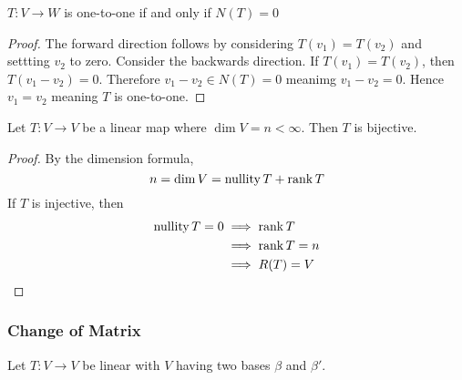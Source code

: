 \documentclass[../notes.tex]{subfiles}
\begin{document}
\begin{theorem}
    $T : V \to W$ is one-to-one if and only if $N(T) = \qty{0}$
\end{theorem}

\begin{proof}
    The forward direction follows by considering $T(v_1) = T(v_2)$ and settting $v_2$ to zero. Consider the backwards direction. If $T(v_1) = T(v_2)$, then $T(v_1 - v_2) = 0$. Therefore $v_1 - v_2 \in N(T) = \qty{0}$ meanimg $v_1 - v_2 = 0$. Hence $v_1 = v_2$ meaning $T$ is one-to-one.
\end{proof}

\begin{theorem}
    Let $T: V \to V$ be a linear map where $\dim V = n < \infty$. Then $T$ is bijective.
\end{theorem}
\begin{proof}
    By the dimension formula,
    \[
        n = \dim V = \operatorname{nullity} T + \rank T
    \]
    If $T$ is injective, then 
    \begin{align*}
        \operatorname{nullity} T = 0 &\implies \rank T \\
                                     &\implies \rank T = n \\
                                     &\implies R(T) = V
    \end{align*}
\end{proof}

\subsubsection{Change of Matrix}
\begin{theorem}
    Let $T : V \to V$ be linear with $V$ having two bases $\beta$ and $\beta'$.
\end{theorem}
\end{document}
